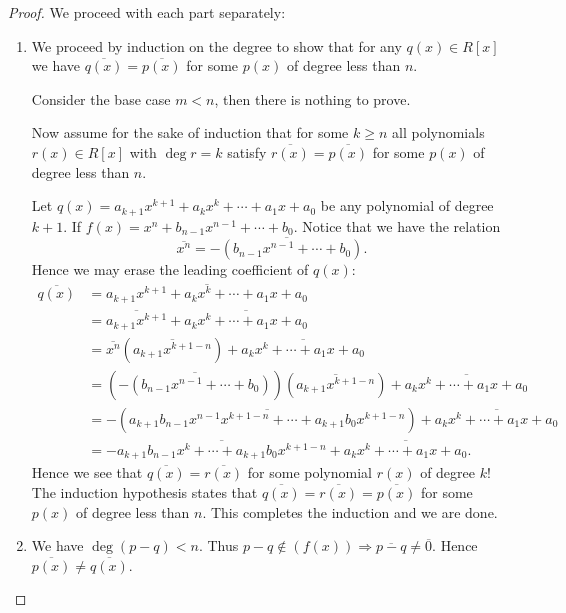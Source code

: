 \documentclass[12pt]{article}
\theoremstyle{remark}
\theoremstyle{named}
\begin{document}
\begin{proof}
    We proceed with each part separately:
    \begin{enumerate}
        \item We proceed by induction on the degree to show that for any \(q(x)\in R[x]\) we have \(\overline{q(x)} = \overline{p(x)}\) for some \(p(x)\) of degree less than \(n\).
        
        Consider the base case \(m < n\), then there is nothing to prove.

        Now assume for the sake of induction that for some \(k \ge n\) all polynomials \(r(x) \in R[x]\) with \(\deg r = k\) satisfy \(\overline{r(x)} = \overline{p(x)}\) for some \(p(x)\) of degree less than \(n\).

        Let \(q(x) = a_{k + 1} x^{k + 1} + a_k x^k + \cdots + a_1 x + a_0\) be any polynomial of degree \(k + 1\). If \(f(x) = x^n + b_{n - 1} x^{n - 1} + \cdots + b_0\). Notice that we have the relation 
        \[\overline{x^n} = \overline{-(b_{n - 1} x^{n - 1} + \cdots + b_0)}.\]
        Hence we may erase the leading coefficient of \(q(x)\):
        \begin{align*}
            \overline{q(x)} &= \overline{a_{k + 1} x^{k + 1} + a_k x^k + \cdots + a_1 x + a_0} \\
            &= \overline{a_{k + 1} x^{k + 1}} + \overline{a_k x^k + \cdots + a_1 x + a_0} \\
            &= \overline{x^n}\left(\overline{a_{k + 1} x^{k + 1 - n}}\right) + \overline{a_k x^k + \cdots + a_1 x + a_0} \\
            &= \left(\overline{-(b_{n - 1} x^{n - 1} + \cdots + b_0)}\right)\left(\overline{a_{k + 1} x^{k + 1 - n}}\right) + \overline{a_k x^k + \cdots + a_1 x + a_0} \\
            &= -\left(\overline{a_{k + 1}b_{n - 1} x^{n - 1}x^{k + 1 - n} + \cdots + a_{k + 1}b_0x^{k + 1 - n}}\right) + \overline{a_k x^k + \cdots + a_1 x + a_0} \\
            &= -\overline{a_{k + 1}b_{n - 1} x^{k} + \cdots + a_{k + 1}b_0x^{k + 1 - n}} + \overline{a_k x^k + \cdots + a_1 x + a_0}.
        \end{align*}
        Hence we see that \(\overline{q(x)} = \overline{r(x)}\) for some polynomial \(r(x)\) of degree \(k\)! The induction hypothesis states that \(\overline{q(x)} = \overline{r(x)} = \overline{p(x)}\) for some \(p(x)\) of degree less than \(n\). This completes the induction and we are done.
        \item We have \(\deg(p - q) < n\). Thus \(p - q \notin (f(x)) \Rightarrow \overline{p - q} \neq \overline{0}\). Hence \(\overline{p(x)} \neq \overline{q(x)}\).

\end{enumerate}
\end{proof}
\end{document}
